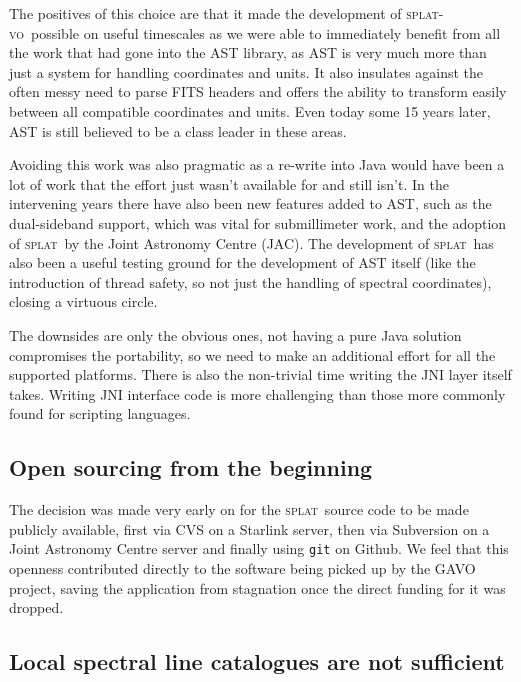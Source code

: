 \documentclass[final,authoryear,5p,times,twocolumn]{elsarticle}
\newcommand{\splat}{\textsc{splat}}
\newcommand{\splatvo}{\textsc{splat-vo}}
\begin{document}
The positives of this choice are that it made the development of
\splatvo\ possible on useful timescales as we were able to immediately
benefit from all the work that had gone into the AST library, as AST
is very much more than just a system for handling coordinates and
units. It also insulates against the often messy need to parse FITS
headers and offers the ability to transform easily between all
compatible coordinates and units. Even today some 15 years later, AST
is still believed to be a class leader in these areas.

Avoiding this work was also pragmatic as a re-write into Java would
have been a lot of work that the effort just wasn't available for and
still isn't. In the intervening years there have also been new
features added to AST, such as the dual-sideband support, which was
vital for submillimeter work, and the adoption of \splat\ by the
Joint Astronomy Centre (JAC). The development of \splat\ has also been a useful testing ground
for the development of AST itself (like the introduction of thread
safety, so not just the handling of spectral coordinates), closing a
virtuous circle.

The downsides are only the obvious ones, not having a pure Java
solution compromises the portability, so we need to make an additional
effort for all the supported platforms. There is also the non-trivial
time writing the JNI layer itself takes. Writing JNI interface code is
more challenging than those more commonly found for scripting
languages.

\subsection{Open sourcing from the beginning}

The decision was made very early on for the \splat\ source code to be
made publicly available, first via CVS on a Starlink server, then via
Subversion on a Joint Astronomy Centre server and finally using \texttt{git}
on Github. We feel that this openness contributed directly to the
software being picked up by the GAVO project, saving the application
from stagnation once the direct funding for it was dropped.

\subsection{Local spectral line catalogues are not sufficient}
\end{document}
